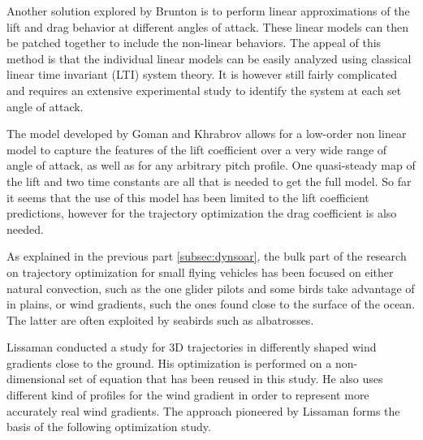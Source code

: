 \par Another solution explored by Brunton \cite{brunton2008unsteady} is to perform linear approximations of the lift and drag behavior at different angles of attack.
These linear models can then be patched together to include the non-linear behaviors.
The appeal of this method is that the individual linear models can be easily analyzed using classical linear time invariant (LTI) system theory.
It is however still fairly complicated and requires an extensive experimental study to identify the system at each set angle of attack.

\par The model developed by Goman and Khrabrov allows for a low-order non linear model to capture the features of the lift coefficient over a very wide range of angle of attack, as well as for any arbitrary pitch profile.
One quasi-steady map of the lift and two time constants are all that is needed to get the full model.
So far it seems that the use of this model has been limited to the lift coefficient predictions, however for the trajectory optimization the drag coefficient is also needed.


\par As explained in the previous part \ref{subsec:dynsoar}, the bulk part of the research on trajectory optimization for small flying vehicles has been focused on either natural convection, such as the one glider pilots and some birds take advantage of in plains, or wind gradients, such the ones found close to the surface of the ocean.
The latter are often exploited by seabirds such as albatrosses.

\par Lissaman \cite{lissaman2005wind} conducted a study for 3D trajectories in differently shaped wind gradients close to the ground.
His optimization is performed on a non-dimensional set of equation that has been reused in this study.
He also uses different kind of profiles for the wind gradient in order to represent more accurately real wind gradients.
The approach pioneered by Lissaman forms the basis of the following optimization study.
